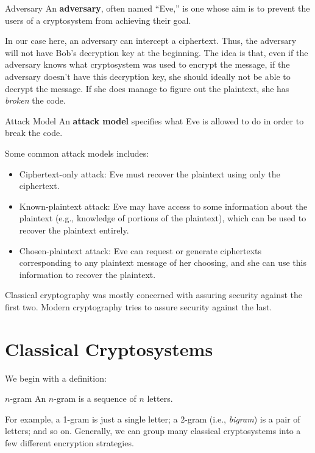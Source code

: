 \documentclass[letterpaper]{article}
\newcommand{\0}{\mathbf{0}}
\begin{document}
\begin{definition}{Adversary}{}
    An \textbf{adversary}, often named ``Eve,'' is one whose aim is to prevent the users of a cryptosystem from achieving their goal. 
\end{definition}
In our case here, an adversary can intercept a ciphertext. Thus, the adversary will not have Bob's decryption key at the beginning. The idea is that, even if the adversary knows what cryptosystem was used to encrypt the message, if the adversary doesn't have this decryption key, she should ideally not be able to decrypt the message. If she does manage to figure out the plaintext, she has \emph{broken} the code.

\begin{definition}{Attack Model}{}
    An \textbf{attack model} specifies what Eve is allowed to do in order to break the code. 
\end{definition}
Some common attack models includes:
\begin{itemize}
    \item Ciphertext-only attack: Eve must recover the plaintext using only the ciphertext.
    \item Known-plaintext attack: Eve may have access to some information about the plaintext (e.g., knowledge of portions of the plaintext), which can be used to recover the plaintext entirely. 
    \item Chosen-plaintext attack: Eve can request or generate ciphertexts corresponding to any plaintext message of her choosing, and she can use this information to recover the plaintext.
\end{itemize}
Classical cryptography was mostly concerned with assuring security against the first two. Modern cryptography tries to assure security against the last. 


\newpage 
\section{Classical Cryptosystems}
We begin with a definition: 
\begin{definition}{$n$-gram}{}
    An $n$-gram is a sequence of $n$ letters.
\end{definition}
For example, a 1-gram is just a single letter; a 2-gram (i.e., \emph{bigram}) is a pair of letters; and so on. Generally, we can group many classical cryptosystems into a few different encryption strategies.
\end{document}
